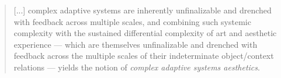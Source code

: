                 \begin{quote}
                    [...] complex adaptive systems are inherently unfinalizable and drenched with feedback across multiple scales, and combining such systemic complexity with the sustained differential complexity of art and aesthetic experience — which are themselves unfinalizable and drenched with feedback across the multiple scales of their indeterminate object/context relations — yields the notion of \emph{complex adaptive systems aesthetics}.
                \end{quote}






